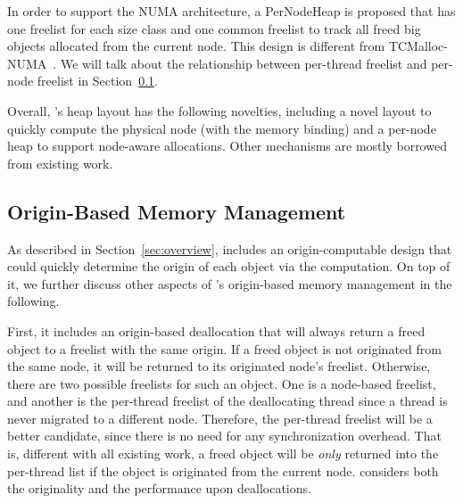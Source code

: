 In order to support the NUMA architecture, a PerNodeHeap is proposed that has one freelist for each size class and one common freelist to track all freed big objects allocated from the current node. This design is different from TCMalloc-NUMA~\citep{tcmallocnew}. We will talk about the relationship between per-thread freelist and per-node freelist in Section~\ref{sec:origin}. 

Overall, \NM{}'s heap layout has the following novelties, including a novel layout to quickly compute the physical node (with the memory binding) and a per-node heap to support node-aware allocations. Other mechanisms are mostly borrowed from existing work.

\subsection{Origin-Based Memory Management} 
\label{sec:origin}

As described in Section~\ref{sec:overview}, \NM{} includes an origin-computable design that could quickly determine the origin of each object via the computation. On top of it, we further discuss other aspects of \NM{}'s origin-based memory management in the following.  

First, it includes an origin-based deallocation that will always return a freed object to a freelist with the same origin. If a freed object is not originated from the same node, it will be returned to its originated node's  freelist. Otherwise, there are two possible freelists for such an object. One is a node-based freelist, and another is the per-thread freelist of the deallocating thread since a thread is never migrated to a different node. Therefore, the per-thread freelist will be a better candidate, since there is no need for any synchronization overhead. That is, different with all existing work, a freed object will be \textit{only} returned into the per-thread list if the object is originated from the current node. \NM{} considers both the originality and the performance upon deallocations.   

